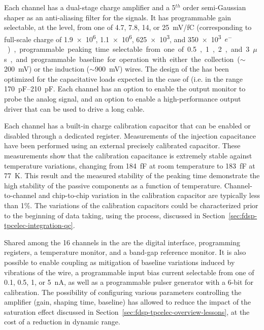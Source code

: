 Each   channel has a dual-stage charge amplifier 
and a \num{5}$^{th}$ order semi-Gaussian shaper as an anti-aliasing 
filter for the  signals. It has programmable gain 
selectable, at the  level, from one of \num{4.7}, \num{7.8}, \num{14}, or \SI{25}{mV/fC}
(corresponding to full-scale charge of \num{1.9e6}, \num{1.1e6}, \num{625e3}, 
and \SI{350e3}{$e^-$}), programmable peaking time selectable from one of 
\num{0.5}, \num{1}, \num{2}, and \SI{3}{$\mu$s}, and programmable 
baseline for operation with either the collection ($\sim$\SI{200}{mV}) 
or the induction ($\sim$\SI{900}{mV}) wires. The design of the
  has been optimized for the capacitative
loads expected in the case of  (i.e. in the range \SIrange{170}{210}{pF}.
Each channel has an 
option to enable the output monitor to probe the analog signal, and 
an option to enable a high-performance output driver that can be 
used to drive a long cable. 

Each   channel has a built-in charge calibration 
capacitor that can be enabled or disabled through a dedicated register. 
Measurements of the injection capacitance have been performed using an 
external precisely calibrated capacitor. These measurements show that
the calibration capacitance is extremely stable against temperature variations, 
changing from \SI{184}{fF} at room temperature to 
\SI{183}{fF} at \SI{77}{K}. This result and the measured stability of 
the peaking time demonstrate the high stability of the passive 
components as a function of temperature. Channel-to-channel and 
chip-to-chip variation in the calibration capacitor are typically 
less than \num{1}\%. The variations of the calibration capacitors
could be characterized prior to the beginning of 
data taking, using the  process, discussed in
Section~\ref{sec:fdsp-tpcelec-integration-qc}.

Shared among the \num{16} channels in the   are 
the digital interface, programming registers, a temperature monitor, 
and a band-gap reference monitor. It is also possible to enable  
coupling as mitigation of baseline variations induced by vibrations
of the  wire, a programmable input bias current 
selectable from one of \num{0.1}, \num{0.5}, \num{1}, or \SI{5}{nA}, 
as well as a programmable pulser generator with a \num{6}-bit 
 for calibration. The possibility of configuring various
parameters controlling the  amplifier (gain, shaping time,
baseline) has allowed  to reduce the impact of the
saturation effect discussed in Section~\ref{sec:fdsp-tpcelec-overview-lessons}, 
at the cost of a reduction in dynamic range.

